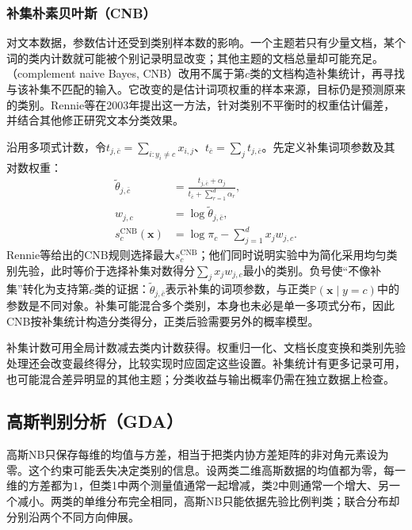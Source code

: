 \subsubsection{补集朴素贝叶斯（CNB）}

\label{sec:classification-naive-bayes-complement}

对文本数据，参数估计还受到类别样本数的影响。一个主题若只有少量文档，某个词的类内计数就可能被个别记录明显改变；其他主题的文档总量却可能充足。（complement naive Bayes, CNB）改用不属于第$c$类的文档构造补集统计，再寻找与该补集不匹配的输入。它改变的是估计词项权重的样本来源，目标仍是预测原来的类别。Rennie等在2003年提出这一方法，针对类别不平衡时的权重估计偏差，并结合其他修正研究文本分类效果。

沿用多项式计数，令$t_{j,\bar c}=\sum_{i:y_i\neq c}x_{i,j}$、$t_{\bar c}=\sum_jt_{j,\bar c}$。先定义补集词项参数及其对数权重：
\begin{equation}
  \label{eq:classification-complement-nb}
  \begin{aligned}
    \tilde\theta_{j,\bar c}
      &=\frac{t_{j,\bar c}+\alpha_j}
              {t_{\bar c}+\sum_{r=1}^{d}\alpha_r},\\
    w_{j,c}&=\log\tilde\theta_{j,\bar c},\\
    s_c^{\mathrm{CNB}}(\bm{x})
      &=\log\pi_c-\sum_{j=1}^{d}x_jw_{j,c}.
  \end{aligned}
\end{equation}
Rennie等给出的CNB规则选择最大$s_c^{\mathrm{CNB}}$；他们同时说明实验中为简化采用均匀类别先验，此时等价于选择补集对数得分$\sum_jx_jw_{j,c}$最小的类别。负号使“不像补集”转化为支持第$c$类的证据：$\tilde\theta_{j,\bar c}$表示补集的词项参数，与正类$\mathbb{P}(\bm{x}\mid y=c)$中的参数是不同对象。补集可能混合多个类别，本身也未必是单一多项式分布，因此CNB按补集统计构造分类得分，正类后验需要另外的概率模型。

补集计数可用全局计数减去类内计数获得。权重归一化、文档长度变换和类别先验处理还会改变最终得分，比较实现时应固定这些设置。补集统计有更多记录可用，也可能混合差异明显的其他主题；分类收益与输出概率仍需在独立数据上检查。

\subsection{高斯判别分析（GDA）}
\label{sec:classification-gda}

高斯NB只保存每维的均值与方差，相当于把类内协方差矩阵的非对角元素设为零。这个约束可能丢失决定类别的信息。设两类二维高斯数据的均值都为零，每一维的方差都为$1$，但类1中两个测量值通常一起增减，类2中则通常一个增大、另一个减小。两类的单维分布完全相同，高斯NB只能依据先验比例判类；联合分布却分别沿两个不同方向伸展。

